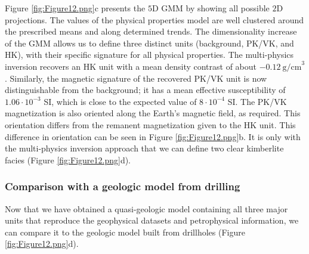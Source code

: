 \documentclass[paper, twocolumn]{geophysics} %
\begin{document}
Figure \ref{fig:Figure12.png}c presents the $5$D GMM by showing all possible $2$D projections. The values of the physical properties model are well clustered around the prescribed means and along determined trends. The dimensionality increase of the GMM allows us to define three distinct units (background, PK/VK, and HK), with their specific signature for all physical properties. The multi-physics inversion recovers an HK unit with a mean density contrast of about $-0.12~\text{g/cm}^3$. Similarly, the magnetic signature of the recovered PK/VK unit is now distinguishable from the background; it has a mean effective susceptibility of $1.06 \cdot 10^{-3}$ SI, which is close to the expected value of $8 \cdot 10^{-4}$ SI. The PK/VK magnetization is also oriented along the Earth's magnetic field, as required. This orientation differs from the remanent magnetization given to the HK unit. This difference in orientation can be seen in Figure \ref{fig:Figure12.png}b. It is only with the multi-physics inversion approach that we can define two clear kimberlite facies (Figure \ref{fig:Figure12.png}d).

\subsubsection{Comparison with a geologic model from drilling}

Now that we have obtained a quasi-geologic model containing all three major units that reproduce the geophysical datasets and petrophysical information, we can compare it to the geologic model built from drillholes (Figure \ref{fig:Figure12.png}d).

\end{document}
